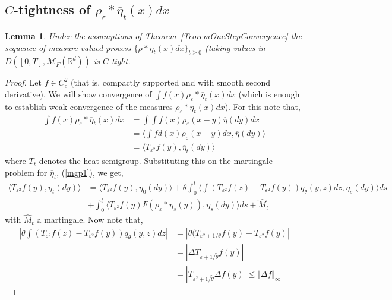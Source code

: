 \documentclass[a4paper,12pt]{article}
\newtheorem{lemma}[theorem]{Lemma}
\newcommand{\1}{{\bf {1}}}
\def\epsilon{\varepsilon}
\begin{document}


\subsection{$C$-tightness of $\rho_\epsilon * \overline{\eta}_t(x) dx$ }
\begin{lemma}
Under the assumptions of Theorem~\ref{TeoremOneStepConvergence} the sequence of measure valued process $\{ \rho*\overline{\eta}_t(x) dx \}_{t \geq 0}$ (taking values in $D([0,T], \mathcal{M}_F(\mathbb{R}^d))$ is $C$-tight.
\end{lemma}
\begin{proof}

Let $f \in C_c^2$ (that is, compactly supported and with smooth second derivative). We will show convergence of $\int f(x) \rho_\epsilon * \overline{\eta}_t(x) dx$ (which is enough to establish weak convergence of the measures $\rho_\epsilon * \overline{\eta}_t(x) dx$). For this note that,
\begin{align*}
\int f(x) \rho_\epsilon * \overline{\eta}_t(x) dx &= \int \int f(x) \rho_\epsilon (x-y) \overline{\eta}(dy) dx \\ & = \langle \int fd(x) \rho_\epsilon(x-y) dx, \overline{\eta}(dy) \rangle \\ &= \langle T_{\epsilon^2} f(y), \overline{\eta}_t(dy) \rangle
\end{align*}
where $T_t$ denotes the heat semigroup. Substituting this on the martingale problem for $\overline{\eta}_t$, (\ref{mgp1}), we get,
\begin{align}
\langle T_{\epsilon^2} f(y), \overline{\eta}_t(dy) \rangle & = \langle T_{\epsilon^2}
 f(y), \overline{\eta}_0(dy) \rangle + \theta \int_0^t \langle \int (T_{\epsilon^2} f(z) - T_{\epsilon^2} f(y))q_\theta(y,z)dz, \overline{\eta}_s(dy)\rangle ds \nonumber \\ &+\int_0^t \langle T_{\epsilon^2} f(y) F(\rho_\epsilon*\overline{\eta}_s(y)), \overline{\eta}_s(dy) \rangle ds + \widehat{M}_t \label{MGPT_epsilon} \end{align}
 with $\widehat{M}_t$ a martingale. Now note that,
 \begin{align}
    | \theta \int (T_{\epsilon^2} f(z) - T_{\epsilon^2}f(y))q_\theta(y,z) dz | &= |\theta( T_{\epsilon^2 + 1/\theta} f(y) - T_{\epsilon^2}f(y)| \nonumber \\ &= | \Delta T_{\epsilon+1/\tilde{\theta}} f(y) | \nonumber \\ &=|T_{\epsilon^2 + 1/\tilde{\theta}} \Delta f(y) | \leq \Vert \Delta f \Vert_{\infty} \label{ShortBoundLaplacianHS}

\end{align}
\end{proof}
\end{document}
